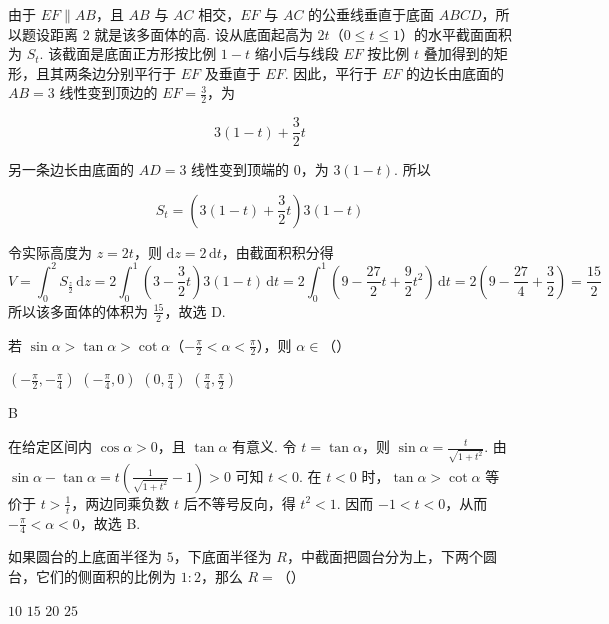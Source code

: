 \begin{solution}
由于 \(EF\parallel AB\)，且 \(AB\) 与 \(AC\) 相交，\(EF\) 与 \(AC\) 的公垂线垂直于底面 \(ABCD\)，所以题设距离 \(2\) 就是该多面体的高. 设从底面起高为 \(2t\)（\(0\leqslant t\leqslant1\)）的水平截面面积为 \(S_t\). 该截面是底面正方形按比例 \(1-t\) 缩小后与线段 \(EF\) 按比例 \(t\) 叠加得到的矩形，且其两条边分别平行于 \(EF\) 及垂直于 \(EF\). 因此，平行于 \(EF\) 的边长由底面的 \(AB=3\) 线性变到顶边的 \(EF=\frac{3}{2}\)，为

\[
3(1-t)+\frac{3}{2}t
\]

另一条边长由底面的 \(AD=3\) 线性变到顶端的 \(0\)，为 \(3(1-t)\). 所以

\[
S_t=\left(3(1-t)+\frac{3}{2}t\right)3(1-t)
\]

令实际高度为 \(z=2t\)，则 \(\mathrm dz=2\,\mathrm dt\)，由截面积积分得
\[
V=\int_0^2 S_{\frac{z}{2}}\,\mathrm dz
 =2\int_0^1\left(3-\frac{3}{2}t\right)3(1-t)\,\mathrm dt
 =2\int_0^1\left(9-\frac{27}{2}t+\frac{9}{2}t^2\right)\,\mathrm dt
 =2\left(9-\frac{27}{4}+\frac{3}{2}\right)
 =\frac{15}{2}
\]
所以该多面体的体积为 \(\frac{15}{2}\)，故选 D.
\end{solution}

\begin{problem}
若 \(\sin \alpha>\tan \alpha>\cot \alpha\)（\(-\frac{\pi}{2}<\alpha<\frac{\pi}{2}\)），则 \(\alpha\in\)（\quad）

\choices
    {\(\left(-\frac{\pi}{2}, -\frac{\pi}{4}\right)\)}
    {\(\left(-\frac{\pi}{4}, 0\right)\)}
    {\(\left(0, \frac{\pi}{4}\right)\)}
    {\(\left(\frac{\pi}{4}, \frac{\pi}{2}\right)\)}
\end{problem}

\begin{answer}
B
\end{answer}

\begin{solution}
在给定区间内 \(\cos\alpha>0\)，且 \(\tan\alpha\) 有意义. 令 \(t=\tan\alpha\)，则
\(\sin\alpha=\frac{t}{\sqrt{1+t^2}}\).
由
\(\sin\alpha-\tan\alpha=t\left(\frac{1}{\sqrt{1+t^2}}-1\right)>0\)
可知 \(t<0\). 在 \(t<0\) 时，\(\tan\alpha>\cot\alpha\) 等价于 \(t>\frac{1}{t}\)，两边同乘负数 \(t\) 后不等号反向，得 \(t^2<1\). 因而
\(-1<t<0\)，从而 \(-\frac{\pi}{4}<\alpha<0\)，故选 B.
\end{solution}

\begin{problem}
如果圆台的上底面半径为 \(5\)，下底面半径为 \(R\)，中截面把圆台分为上，下两个圆台，它们的侧面积的比例为 \(1:2\)，那么 \(R=\)（\quad）

\choices
    {\(10\)}
    {\(15\)}
    {\(20\)}
    {\(25\)}
\end{problem}

